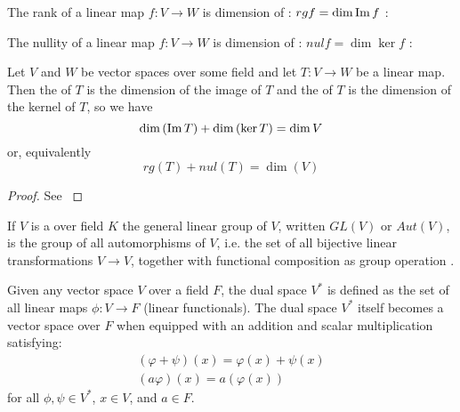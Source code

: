 \begin{appendices}
\begin{definition}[Rank]
  The rank of a linear map $f: V \to W$ is dimension of
  : $rg f = \dim \operatorname{Im} f$ \cite{wiki:rank}:
  \label{def:rank}
\end{definition}

\begin{definition}[Nullity]
  The nullity of a linear map $f: V \to W$ is dimension of
  : $nul f = \dim \ker f$ \cite{wiki:kernel}:
  \label{def:nullity}
\end{definition}

\begin{theorem}
  Let $V$ and $W$ be vector spaces over some field and let $T: V \to
  W$ be a linear map. Then the  of $T$ is the
  dimension of the image of $T$ and the  of $T$
  is the dimension of the kernel of $T$, so we have
  \[
  \dim\left(\operatorname{Im} T\right) + \dim\left(\ker T\right) = \dim V
  \]
  or, equivalently
  \[
  rg(T) + nul(T) = \dim(V)
  \]
  \label{thm:ranknullity}
  \begin{proof}
    See \cite{wiki:ranknullity}
  \end{proof}
\end{theorem}

\begin{definition}
  If $V$ is a  over field $K$  the general
  linear group of $V$, written $GL\left(V\right)$ or
  $Aut\left(V\right)$, is the group of all automorphisms of $V$,
  i.e. the set of all bijective linear transformations $V \to V$,
  together with functional composition as group operation \cite{wiki:glg}.  
  \label{def:glv}
\end{definition}

\begin{definition}
  Given any vector space $V$ over a field $F$, the dual space $V^\ast$
  is defined as the set of all linear maps $\phi: V \to F$ (linear
  functionals). The dual space $V^\ast$ itself becomes a vector space
  over $F$ when equipped with an addition and scalar multiplication
  satisfying: 
  \begin{eqnarray}
    (\varphi +\psi )(x)=\varphi (x)+\psi (x)
    \nonumber \\
    (a\varphi )(x)=a\left(\varphi (x)\right)
    \nonumber
  \end{eqnarray}
  for all $\phi, \psi \in V^\ast$, $x \in V$, and $a \in F$.


\end{definition}
\end{appendices}
